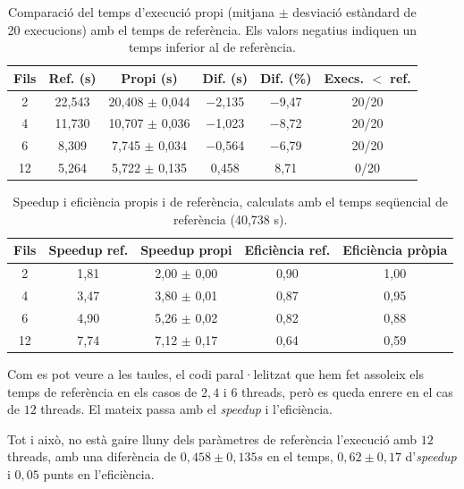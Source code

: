 \documentclass{article}
\begin{document}
\begin{table}[H]
\centering
\begin{tabular}{|c|c|c|c|c|c|}
\hline
\textbf{Fils} & \textbf{Ref. (s)} & \textbf{Propi (s)} & \textbf{Dif. (s)} & \textbf{Dif. (\%)} & \textbf{Execs. $<$ ref.} \\ \hline
2 & 22,543 & 20,408 $\pm$ 0,044 & $-$2,135 & $-$9,47 & 20/20 \\ \hline
4 & 11,730 & 10,707 $\pm$ 0,036 & $-$1,023 & $-$8,72 & 20/20 \\ \hline
6 & 8,309 & 7,745 $\pm$ 0,034 & $-$0,564 & $-$6,79 & 20/20 \\ \hline
12 & 5,264 & 5,722 $\pm$ 0,135 & 0,458 & 8,71 & 0/20 \\ \hline
\end{tabular}
\caption{Comparació del temps d'execució propi (mitjana $\pm$ desviació estàndard de 20 execucions) amb el temps de referència. Els valors negatius indiquen un temps inferior al de referència.}
\label{tab:comp_temps}
\end{table}

\begin{table}[H]
\centering
\begin{tabular}{|c|c|c|c|c|}
\hline
\textbf{Fils} & \textbf{Speedup ref.} & \textbf{Speedup propi} & \textbf{Eficiència ref.} & \textbf{Eficiència pròpia} \\ \hline
2 & 1,81 & 2,00 $\pm$ 0,00 & 0,90 & 1,00 \\ \hline
4 & 3,47 & 3,80 $\pm$ 0,01 & 0,87 & 0,95 \\ \hline
6 & 4,90 & 5,26 $\pm$ 0,02 & 0,82 & 0,88 \\ \hline
12 & 7,74 & 7,12 $\pm$ 0,17 & 0,64 & 0,59 \\ \hline
\end{tabular}
\caption{Speedup i eficiència propis i de referència, calculats amb el temps seqüencial de referència (40,738 s).}
\label{tab:comp_speedup}
\end{table}

Com es pot veure a les taules, el codi paral·lelitzat que hem fet assoleix els temps de referència en els casos de $2, 4$ i $6$ threads, però es queda enrere en el cas de $12$ threads. El mateix passa amb el \textit{speedup} i l'eficiència. 

Tot i això, no està gaire lluny dels paràmetres de referència l'execució amb $12$ threads, amb una diferència de $0,458 \pm 0,135s$ en el temps, $0,62 \pm 0,17$ d'\textit{speedup} i $0,05$ punts en l'eficiència.
\end{document}
